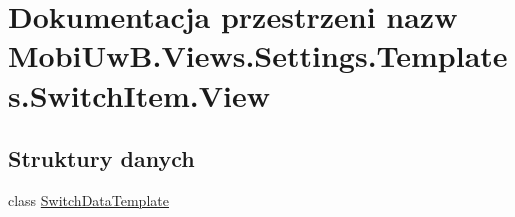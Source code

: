 \hypertarget{a00289}{}\section{Dokumentacja przestrzeni nazw Mobi\+Uw\+B.\+Views.\+Settings.\+Templates.\+Switch\+Item.\+View}
\label{a00289}
\subsection*{Struktury danych}
\begin{DoxyCompactItemize}
\item 
class \hyperlink{a00064}{Switch\+Data\+Template}
\end{DoxyCompactItemize}

